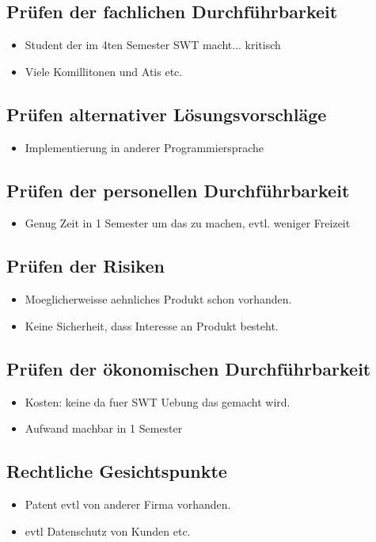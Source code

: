 \documentclass[parskip=full]{scrartcl}
\begin{document}
\subsection{Prüfen der fachlichen Durchführbarkeit}
\begin{itemize}
\item Student der im 4ten Semester SWT macht... kritisch
\item Viele Komillitonen und Atis etc. 
\end{itemize}
\subsection{Prüfen alternativer Lösungsvorschläge}
\begin{itemize}
\item Implementierung in anderer Programmiersprache
\end{itemize}
\subsection{Prüfen der personellen Durchführbarkeit}
\begin{itemize}
\item Genug Zeit in 1 Semester um das zu machen, evtl. weniger Freizeit
\end{itemize}
\subsection{Prüfen der Risiken}
\begin{itemize}
\item Moeglicherweisse aehnliches Produkt schon vorhanden.
\item Keine Sicherheit, dass Interesse an Produkt besteht.
\end{itemize}
\subsection{Prüfen der ökonomischen Durchführbarkeit}
\begin{itemize}
\item Kosten: keine da fuer SWT Uebung das gemacht wird.
\item Aufwand machbar in 1 Semester
\end{itemize}
\subsection{Rechtliche Gesichtspunkte}
\begin{itemize}
\item Patent evtl von anderer Firma vorhanden.
\item evtl Datenschutz von Kunden etc.
\end{itemize}

\glsaddall
\printnoidxglossaries
\end{document}
